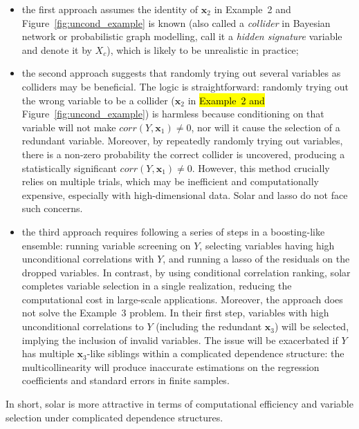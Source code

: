 \documentclass[12pt]{article}
\begin{document}
\begin{itemize}
  \item the first approach \citep[Section~2.2 and~3]{barut2016conditional} assumes the identity of $\mathbf{x}_2$ in Example~2 and Figure~\ref{fig:uncond_example} is known (also called a \emph{collider} in Bayesian network or probabilistic graph modelling, \citet{barut2016conditional} call it a \emph{hidden signature} variable and denote it by $X_c$), which is likely to be unrealistic in practice;
  \item the second approach \citep[Section~1 and~2.2]{barut2016conditional} suggests that randomly trying out several variables as colliders may be beneficial. The logic is straightforward: randomly trying out the wrong variable to be a collider ($\mathbf{x}_2$ in \hl{Example~2 and} Figure~\ref{fig:uncond_example}) is harmless because conditioning on that variable will not make $corr(Y,\mathbf{x}_1) \neq 0$, nor will it cause the selection of a redundant variable. Moreover, by repeatedly randomly trying out variables, there is a non-zero probability the correct collider is uncovered, producing a statistically significant $corr(Y,\mathbf{x}_1) \neq 0$. However, this method crucially relies on multiple trials, which may be inefficient and computationally expensive, especially with high-dimensional data. Solar and lasso do not face such concerns.
  \item the third approach \citep{fan2008sure} requires following a series of steps in a boosting-like ensemble: running variable screening on $Y$, selecting variables having high unconditional correlations with $Y$, and running a lasso of the residuals on the dropped variables. In contrast, by using conditional correlation ranking, solar completes variable selection in a single realization, reducing the computational cost in large-scale applications. Moreover, the \citet{fan2008sure} approach does not solve the Example~3 problem. In their first step, variables with high unconditional correlations to $Y$ (including the redundant $\mathbf{x}_3$) will be selected, implying the inclusion of invalid variables. The issue will be exacerbated if $Y$ has multiple $\mathbf{x}_3$-like siblings within a complicated dependence structure: the multicollinearity will produce inaccurate estimations on the regression coefficients and standard errors in finite samples.
\end{itemize}

\noindent
In short, solar is more attractive in terms of computational efficiency and variable selection under complicated dependence structures.
\end{document}
